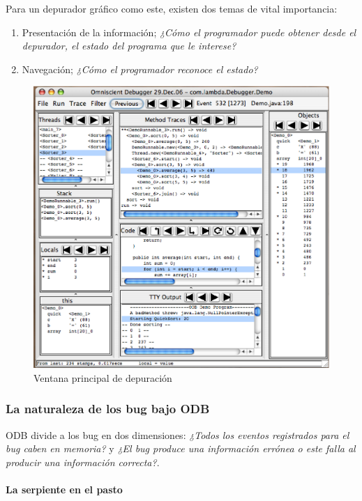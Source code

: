 \documentclass[12pt,legalpaper]{report}
\begin{document}
Para un depurador gráfico como este, existen dos temas de vital importancia:
\begin{enumerate}
	\item Presentación de la información; \textit{¿Cómo el programador puede obtener desde el depurador, el estado del programa que le interese?}
	\item Navegación; \textit{¿Cómo el programador reconoce el estado?}
\end{enumerate} 

\begin{figure}[h]
	\centering
	\includegraphics[scale=0.5]{images/ODB/main.eps}
	\caption{Ventana principal de depuración}
	\label{mainWindow}
\end{figure}

			\subsubsection{La naturaleza de los bug bajo ODB}

ODB divide a los bug en dos dimensiones:  \textit{¿Todos los eventos registrados para el bug caben en memoria?} y \textit{¿El bug produce una información errónea o este falla al producir una información correcta?}.

				\paragraph{La serpiente en el pasto}
\end{document}
